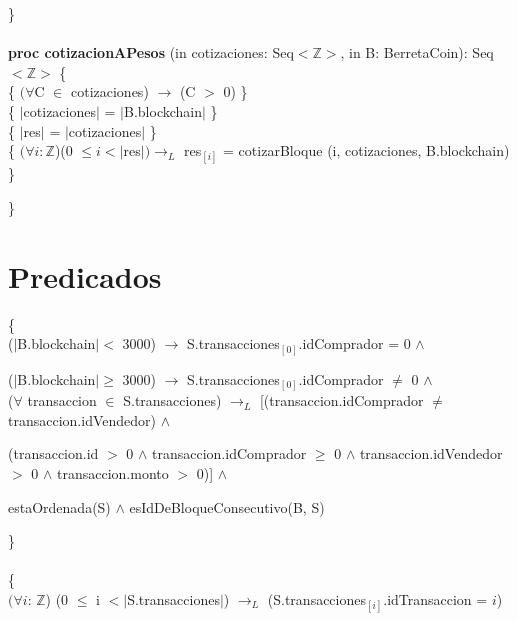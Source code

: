 \documentclass{article}
\newcommand{\Entero}{$\mathds{Z}$}
\begin{document}
    \}\\\\

    {\selectfont\textbf{proc cotizacionAPesos} (in cotizaciones: Seq$<$\Entero$>$, in B: BerretaCoin): Seq$<$\Entero$>$} \{\\
        \indent{} \{ $(\forall$C $\in$ cotizaciones) $\rightarrow$ (C $>$ 0) \}\\
        \indent{} \{ $|$cotizaciones$|$ = $|$B.blockchain$|$ \}\\
        \indent{} \{ $|$res$|$ = $|$cotizaciones$|$ \}\\
        \indent{} \{ $(\forall i: $\Entero)(0 $\le i < |$res$|)\rightarrow_{L}$ res$_{[i]}$ = cotizarBloque (i, cotizaciones, B.blockchain) \}

    \}\\
    \newpage
    \section*{Predicados}


     \{\\
        \indent\indent ($|$B.blockchain$|<$ 3000) $\rightarrow$ S.transacciones$_{[0]}$.idComprador = 0 $\land$

        \indent\indent ($|$B.blockchain$|\ge$ 3000) $\rightarrow$ S.transacciones$_{[0]}$.idComprador $\ne$ 0 $\land$\\
        \indent\indent($\forall$ transaccion $\in$ S.transacciones) $\rightarrow_{L}$ [(transaccion.idComprador $\ne$ transaccion.idVendedor) $\land$

        \indent\indent(transaccion.id $>$ 0 $\land$ transaccion.idComprador $\ge$ 0 $\land$ transaccion.idVendedor $>$ 0 $\land$ transaccion.monto $>$ 0)] $\land$

        \indent\indent estaOrdenada(S) $\land$ esIdDeBloqueConsecutivo(B, S)

    \indent\}\\\\



     \{\\
        \indent\indent $(\forall i$: \Entero) (0 $\le$ i $< |$S.transacciones$|$) $\rightarrow_{L}$ (S.transacciones$_{[i]}$.idTransaccion = $i$)
\end{document}
